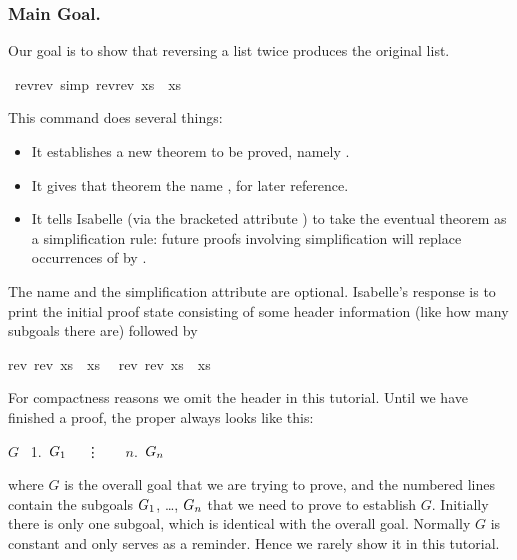 \begin{isabellebody}
\begin{isamarkuptext}
\subsubsection*{Main Goal.}

Our goal is to show that reversing a list twice produces the original
list.%
\end{isamarkuptext}%
\isamarkuptrue%
\ rev{\isacharunderscore}rev\ {\isacharbrackleft}simp{\isacharbrackright}{\isacharcolon}\ {\isachardoublequote}rev{\isacharparenleft}rev\ xs{\isacharparenright}\ {\isacharequal}\ xs{\isachardoublequote}\isamarkupfalse%
%
\begin{isamarkuptxt}%
%
\noindent
This  command does several things:
\begin{itemize}
\item
It establishes a new theorem to be proved, namely .
\item
It gives that theorem the name , for later reference.
\item
It tells Isabelle (via the bracketed attribute ) to take the eventual theorem as a simplification rule: future proofs involving
simplification will replace occurrences of  by
.
\end{itemize}
The name and the simplification attribute are optional.
Isabelle's response is to print the initial proof state consisting
of some header information (like how many subgoals there are) followed by
\begin{isabelle}%
rev\ {\isacharparenleft}rev\ xs{\isacharparenright}\ {\isacharequal}\ xs\isanewline
\ {}{\isachardot}\ rev\ {\isacharparenleft}rev\ xs{\isacharparenright}\ {\isacharequal}\ xs%
\end{isabelle}
For compactness reasons we omit the header in this tutorial.
Until we have finished a proof, the  proper
always looks like this:
\begin{isabelle}
$G$\isanewline
~1.~$G\sb{1}$\isanewline
~~\vdots~~\isanewline
~$n$.~$G\sb{n}$
\end{isabelle}
where $G$
is the overall goal that we are trying to prove, and the numbered lines
contain the subgoals $G\sb{1}$, \dots, $G\sb{n}$ that we need to prove to
establish $G$.
Initially there is only one subgoal, which is
identical with the overall goal.  Normally $G$ is constant and only serves as
a reminder. Hence we rarely show it in this tutorial.


\end{isamarkuptxt}
\end{isabellebody}
